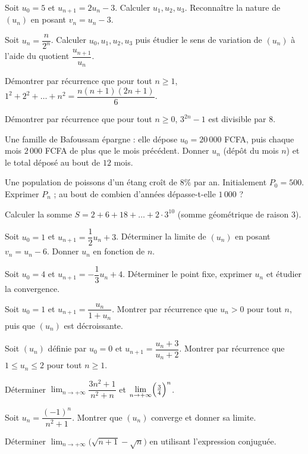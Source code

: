 \exo{} Soit $u_0=5$ et $u_{n+1}=2u_n-3$. Calculer $u_1,u_2,u_3$. Reconnaître la nature de $(u_n)$
en posant $v_n=u_n-3$.

\exo{} Soit $u_n=\dfrac{n}{2^n}$. Calculer $u_0,u_1,u_2,u_3$ puis étudier le sens de
variation de $(u_n)$ à l'aide du quotient $\dfrac{u_{n+1}}{u_n}$.

\exo{} Démontrer par récurrence que pour tout $n\ge1$, $1^2+2^2+\dots+n^2=\dfrac{n(n+1)(2n+1)}{6}$.

\exo{} Démontrer par récurrence que pour tout $n\ge0$, $3^{2n}-1$ est divisible par $8$.

\exo{} Une famille de Bafoussam épargne : elle dépose $u_0=20\,000$ FCFA, puis chaque mois
$2\,000$ FCFA de plus que le mois précédent. Donner $u_n$ (dépôt du mois $n$) et le total déposé au bout
de $12$ mois.

\exo{} Une population de poissons d'un étang croît de $8\%$ par an. Initialement $P_0=500$.
Exprimer $P_n$ ; au bout de combien d'années dépasse-t-elle $1\,000$ ?

\exo{} Calculer la somme $S=2+6+18+\dots+2\cdot3^{10}$ (somme géométrique de raison $3$).

\exo{} Soit $u_0=1$ et $u_{n+1}=\dfrac12 u_n+3$. Déterminer la limite de $(u_n)$ en posant
$v_n=u_n-6$. Donner $u_n$ en fonction de $n$.

\exo{} Soit $u_0=4$ et $u_{n+1}=-\dfrac13 u_n+4$. Déterminer le point fixe, exprimer $u_n$
et étudier la convergence.

\exo{} Soit $u_0=1$ et $u_{n+1}=\dfrac{u_n}{1+u_n}$. Montrer par récurrence que $u_n>0$ pour
tout $n$, puis que $(u_n)$ est décroissante.

\exo{} Soit $(u_n)$ définie par $u_0=0$ et $u_{n+1}=\dfrac{u_n+3}{u_n+2}$.
Montrer par récurrence que $1\le u_n\le2$ pour tout $n\ge1$.

\exo{} Déterminer $\displaystyle\lim_{n\to+\infty}\dfrac{3n^2+1}{n^2+n}$ et
$\displaystyle\lim_{n\to+\infty}\Bigl(\tfrac34\Bigr)^n$.

\exo{} Soit $u_n=\dfrac{(-1)^n}{n^2+1}$. Montrer que $(u_n)$ converge et donner sa limite.

\exo{} Déterminer $\displaystyle\lim_{n\to+\infty}\bigl(\sqrt{n+1}-\sqrt n\bigr)$
en utilisant l'expression conjuguée.

